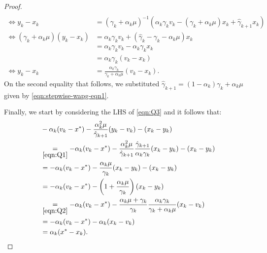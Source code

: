 \documentclass[12pt]{article}
\begin{document}
\begin{proof}
\begin{align*}
            \\
            \iff
            y_k - x_k &= 
            (\gamma_k + \alpha_k \mu)^{-1}
            (\alpha_k \gamma_k v_k - (\gamma_k + \alpha_k \mu)x_k + \hat \gamma_{k + 1} x_k)
            \\
            \iff 
            (\gamma_k + \alpha_k \mu)(y_k - x_k)
            &= 
            \alpha_k\gamma _kv_k + 
            (\hat \gamma_k - \gamma_k - \alpha_k \mu) x_k
            \\
            &= \alpha_k \gamma_k v_k - \alpha_k \gamma_k x_k 
            \\
            &= \alpha_k \gamma_k(v_k - x_k)
            \\
            \iff 
            y_k - x_k &= 
            \frac{\alpha_k \gamma_k}{\gamma_k + \alpha_k \mu}(v_k - x_k). 
        \end{align*}
        On the second equality that follows, we substituted $\hat\gamma_{k + 1} = (1 - \alpha_k)\gamma_k + \alpha_k \mu$ given by \eqref{eqn:stepwise-wapg-eqn1}. 
        \par
        Finally, we start by considering the LHS of \eqref{eqn:Q3} and it follows that: 
        \begin{align*}
            &  
            - \alpha_k(v_k - x^*) - \frac{\alpha_k^2 \mu}{\hat \gamma_{k + 1}}(y_k - v_k) - (x_k - y_k)
            \\
            & \underset{\eqref{eqn:Q1}}{=}
            -\alpha_k(v_k - x^*) -
            \frac{\alpha_k^2\mu}{\hat \gamma_{k + 1}}
            \frac{\hat \gamma_{k + 1}}{\alpha_k \gamma_k}(x_k - y_k)
            - (x_k - y_k) 
            \\
            &= 
            -\alpha_k(v_k - x^*) -
            \frac{\alpha_k \mu}{\gamma_k}(x_k - y_k)
            - (x_k - y_k) 
            \\
            &= 
            -\alpha_k(v_k - x^*) -
            \left(
                1 + \frac{\alpha_k \mu}{\gamma_k}
            \right)(x_k - y_k)
            \\
            &\underset{\eqref{eqn:Q2}}{=}
            -\alpha_k(v_k - x^*) - 
            \frac{\alpha_k \mu + \gamma_k}{\gamma_k}
            \frac{\alpha_k \gamma_k}{\gamma_k + \alpha_k \mu}(x_k - v_k)
            \\
            &= 
            -\alpha_k(v_k - x^*)
            - \alpha_k(x_k - v_k)
            \\
            &= \alpha_k(x^* - x_k). 
        \end{align*}
    \end{proof}
\end{document}
